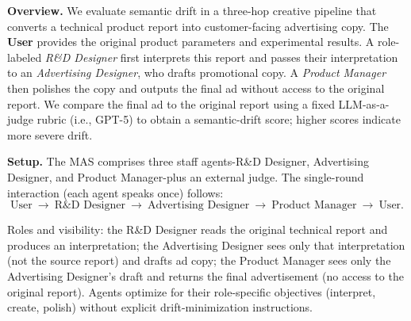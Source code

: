 \documentclass[11pt, letterpaper, shortlabels]{berkeley}
\begin{document}
\textbf{Overview.}
We evaluate semantic drift in a three-hop creative pipeline that converts a technical product report into customer-facing advertising copy. The \textbf{User} provides the original product parameters and experimental results. A role-labeled \textit{R\&D Designer} first interprets this report and passes their interpretation to an \textit{Advertising Designer}, who drafts promotional copy. A \textit{Product Manager} then polishes the copy and outputs the final ad without access to the original report. We compare the final ad to the original report using a fixed LLM-as-a-judge rubric (i.e., GPT-5) \citep{zheng2023judging} to obtain a semantic-drift score; higher scores indicate more severe drift.






\textbf{Setup.}
The MAS comprises three staff agents-R\&D Designer, Advertising Designer, and Product Manager-plus an external judge. The single-round interaction (each agent speaks once) follows:
\[
\text{User}\ \rightarrow\ \text{R\&D Designer}\ \rightarrow\ \text{Advertising Designer}\ \rightarrow\ \text{Product Manager}\ \rightarrow\ \text{User}.
\]



Roles and visibility: the R\&D Designer reads the original technical report and produces an interpretation; the Advertising Designer sees only that interpretation (not the source report) and drafts ad copy; the Product Manager sees only the Advertising Designer’s draft and returns the final advertisement (no access to the original report). Agents optimize for their role-specific objectives (interpret, create, polish) without explicit drift-minimization instructions.
\end{document}
